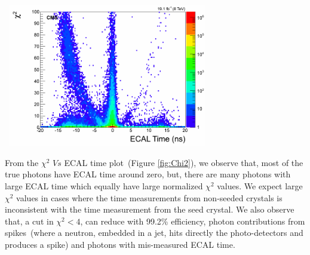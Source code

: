  \vspace{5mm}
\begin{minipage}{0.90\linewidth} 
\begin{center}
\mbox{
\includegraphics[height=.450\textwidth, width=0.65\textwidth]{THESISPLOTS/seedTime_Chi2.png} }
\label{fig:Chi2}
\end{center}
\end{minipage}

 \vspace{5mm}
From the $\chi^{2}$ $Vs$ ECAL time plot~(Figure \ref{fig:Chi2}), we observe that, most of the true photons have ECAL time around zero, but, there are many photons with large ECAL time which equally have large normalized $\chi^{2}$ values. We expect large $\chi^{2}$ values in cases where the time measurements from non-seeded crystals is inconsistent with the time measurement from the seed crystal. We also observe that, a cut in $\chi^{2} < 4$, can reduce with 99.2\% efficiency, photon contributions from spikes~(where a neutron, embedded in a jet, hits directly the photo-detectors and produces a spike) and photons with mis-measured ECAL time.
